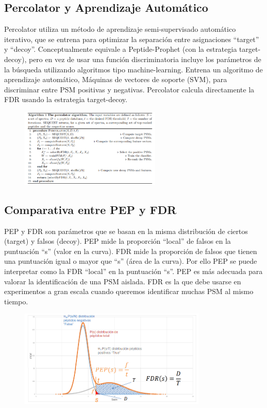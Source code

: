 \subsection{Percolator y Aprendizaje Automático}
Percolator utiliza un método de aprendizaje semi-supervisado automático iterativo, que se entrena para optimizar la separación entre asignaciones “target” y “decoy”.
Conceptualmente equivale a Peptide-Prophet (con la estrategia target-decoy), pero en vez de usar una función discriminatoria incluye los parámetros de la búsqueda utilizando algoritmos tipo machine-learning.
Entrena un algoritmo de aprendizaje automático, Máquinas de vectores de soporte (SVM), para discriminar entre PSM positivas y negativas.
Percolator calcula directamente la FDR usando la estrategia target-decoy.

\begin{figure}[h]
\centering
\includegraphics[width = 0.6\textwidth]{figs/percolator-pseudocode.png}
\end{figure}

\subsection{Comparativa entre PEP y FDR}
PEP y FDR son parámetros que se basan en la misma distribución de ciertos (target) y falsos (decoy). PEP mide la proporción “local” de falsos en la puntuación “s” (valor en la curva). FDR mide la proporción de falsos que tienen una puntuación igual o mayor que “s” (área de la curva). Por ello PEP se puede interpretar como la FDR “local” en la puntuación “s”. PEP es más adecuada para valorar la identificación de una PSM aislada. FDR es la que debe usarse en experimentos a gran escala cuando queremos identificar muchas PSM al mismo tiempo.
\begin{figure}[h]
\centering
\includegraphics[width = 0.8\textwidth]{figs/pep-fdr.png}
\end{figure}


